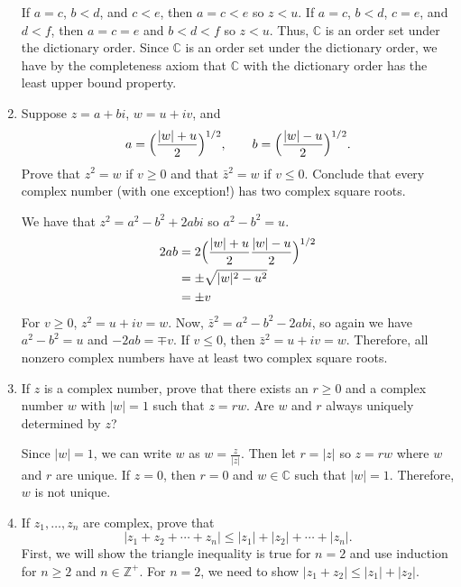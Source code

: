 \begin{enumerate}
  If \(a = c\), \(b < d\), and \(c < e\), then \(a = c < e\) so \(z < u\).
  If \(a = c\), \(b < d\), \(c = e\), and \(d < f\), then \(a = c = e\) and
  \(b < d < f\) so \(z < u\).
  Thus, \(\mathbb{C}\) is an order set under the dictionary order.
  Since \(\mathbb{C}\) is an order set under the dictionary order, we have by
  the completeness axiom that \(\mathbb{C}\) with the dictionary order has the
  least upper bound property.
\item
  Suppose \(z = a + bi\), \(w = u + iv\), and
  \[
  a = \Bigl(\frac{\lvert w\rvert + u}{2}\Bigr)^{1/2},\qquad
  b = \Bigl(\frac{\lvert w\rvert - u}{2}\Bigr)^{1/2}.
  \]
  Prove that \(z^2 = w\) if \(v\geq 0\) and that \(\bar{z}^2 = w\) if
  \(v\leq 0\).
  Conclude that every complex number (with one exception!) has two complex
  square roots.
  \par\smallskip
  We have that \(z^2 = a^2 - b^2 + 2abi\) so \(a^2 - b^2 = u\).
  \begin{align*}
    2ab & = 2\Bigl(\frac{\lvert w\rvert + u}{2}
          \frac{\lvert w\rvert - u}{2}\Bigr)^{1/2}\\
        & = \pm\sqrt{\lvert w\rvert^2 - u^2}\\
        & = \pm v
  \end{align*}
  For \(v \geq 0\), \(z^2 = u + iv = w\).
  Now, \(\bar{z}^2 = a^2 - b^2 - 2abi\), so again we have \(a^2 - b^2 = u\) and
  \(-2ab = \mp v\).
  If \(v \leq 0\), then \(\bar{z}^2 = u + iv = w\).
  Therefore, all nonzero complex numbers have at least two complex square
  roots.
\item
  If \(z\) is a complex number, prove that there exists an \(r\geq 0\) and a
  complex number \(w\) with \(\lvert w\rvert = 1\) such that \(z = rw\).
  Are \(w\) and \(r\) always uniquely determined by \(z\)?
  \par\smallskip
  Since \(\lvert w\rvert = 1\), we can write \(w\) as
  \(w = \frac{z}{\lvert z\rvert}\).
  Then let \(r = \lvert z\rvert\) so \(z = rw\) where \(w\) and \(r\) are
  unique.
  If \(z = 0\), then \(r = 0\) and \(w\in\mathbb{C}\) such that
  \(\lvert w\rvert = 1\).
  Therefore, \(w\) is not unique.
\item
  If \(z_1,\ldots, z_n\) are complex, prove that
  \[
  \lvert z_1 + z_2 + \cdots + z_n\rvert\leq\lvert z_1\rvert + \lvert z_2\rvert
  + \cdots + \lvert z_n\rvert.
  \]
  First, we will show the triangle inequality is true for \(n = 2\) and use
  induction for \(n\geq 2\) and \(n\in\mathbb{Z}^+\).
  For \(n = 2\), we need to show
  \(\lvert z_1 + z_2\rvert\leq\lvert z_1\rvert + \lvert z_2\rvert\).

\end{enumerate}
